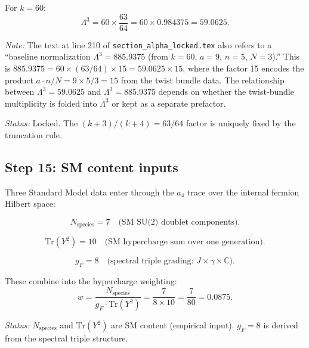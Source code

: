 \documentclass[12pt,a4paper]{article}
\begin{document}
For $k = 60$:
\begin{equation}\tag{E14e}
\Lambda^3 = 60 \times \frac{63}{64} = 60 \times 0.984375 = 59.0625.
\end{equation}

\textit{Note:} The text at line 210 of \texttt{section\_alpha\_locked.tex}
also refers to a ``baseline normalization $\Lambda^3 = 885.9375$ (from
$k = 60$, $a = 9$, $n = 5$, $N = 3$).''  This is $885.9375 = 60 \times (63/64) \times 15
= 59.0625 \times 15$, where the factor 15 encodes the product
$a \cdot n / N = 9 \times 5 / 3 = 15$ from the twist bundle data.
The relationship between $\Lambda^3 = 59.0625$ and $\Lambda^3 = 885.9375$
depends on whether the twist-bundle multiplicity is folded into $\Lambda^3$
or kept as a separate prefactor.

\textit{Status:} Locked.  The $(k+3)/(k+4) = 63/64$ factor is uniquely
fixed by the truncation rule.

\subsection{Step 15: SM content inputs}

Three Standard Model data enter through the $a_4$ trace over the
internal fermion Hilbert space:

\begin{equation}\tag{E15a}
N_{\mathrm{species}} = 7 \quad \text{(SM SU(2) doublet components)}.
\end{equation}

\begin{equation}\tag{E15b}
\mathrm{Tr}(Y^2) = 10 \quad \text{(SM hypercharge sum over one generation)}.
\end{equation}

\begin{equation}\tag{E15c}
g_F = 8 \quad \text{(spectral triple grading: } J \times \gamma \times \mathbb{C}\text{)}.
\end{equation}

These combine into the hypercharge weighting:
\begin{equation}\tag{E15d}
w = \frac{N_{\mathrm{species}}}{g_F \cdot \mathrm{Tr}(Y^2)}
= \frac{7}{8 \times 10} = \frac{7}{80} = 0.0875.
\end{equation}

\textit{Status:} $N_{\mathrm{species}}$ and $\mathrm{Tr}(Y^2)$ are SM
content (empirical input).  $g_F = 8$ is derived from the spectral triple
structure.
\end{document}
